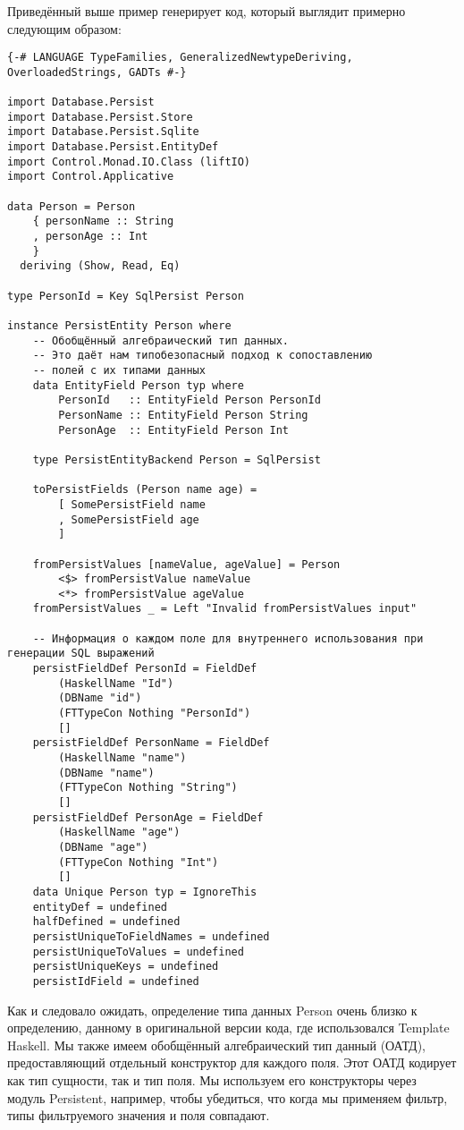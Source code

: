 Приведённый выше пример генерирует код, который выглядит примерно следующим образом:

\begin{lstlisting}
{-# LANGUAGE TypeFamilies, GeneralizedNewtypeDeriving, OverloadedStrings, GADTs #-}

import Database.Persist
import Database.Persist.Store
import Database.Persist.Sqlite
import Database.Persist.EntityDef
import Control.Monad.IO.Class (liftIO)
import Control.Applicative

data Person = Person
    { personName :: String
    , personAge :: Int
    }
  deriving (Show, Read, Eq)

type PersonId = Key SqlPersist Person

instance PersistEntity Person where
    -- Обобщённый алгебраический тип данных.
    -- Это даёт нам типобезопасный подход к сопоставлению
    -- полей с их типами данных
    data EntityField Person typ where
        PersonId   :: EntityField Person PersonId
        PersonName :: EntityField Person String
        PersonAge  :: EntityField Person Int

    type PersistEntityBackend Person = SqlPersist

    toPersistFields (Person name age) =
        [ SomePersistField name
        , SomePersistField age
        ]

    fromPersistValues [nameValue, ageValue] = Person
        <$> fromPersistValue nameValue
        <*> fromPersistValue ageValue
    fromPersistValues _ = Left "Invalid fromPersistValues input"

    -- Информация о каждом поле для внутреннего использования при генерации SQL выражений
    persistFieldDef PersonId = FieldDef
        (HaskellName "Id")
        (DBName "id")
        (FTTypeCon Nothing "PersonId")
        []
    persistFieldDef PersonName = FieldDef
        (HaskellName "name")
        (DBName "name")
        (FTTypeCon Nothing "String")
        []
    persistFieldDef PersonAge = FieldDef
        (HaskellName "age")
        (DBName "age")
        (FTTypeCon Nothing "Int")
        []
    data Unique Person typ = IgnoreThis
    entityDef = undefined
    halfDefined = undefined
    persistUniqueToFieldNames = undefined
    persistUniqueToValues = undefined
    persistUniqueKeys = undefined
    persistIdField = undefined
\end{lstlisting}%

Как и следовало ожидать, определение типа данных Person очень близко к определению, данному в оригинальной версии кода, где использовался Template Haskell. Мы также имеем обобщённый алгебраический тип данный (ОАТД), предоставляющий отдельный конструктор для каждого поля. Этот ОАТД кодирует как тип сущности, так и тип поля. Мы используем его конструкторы через модуль Persistent, например, чтобы убедиться, что когда мы применяем фильтр, типы фильтруемого значения и поля совпадают.

